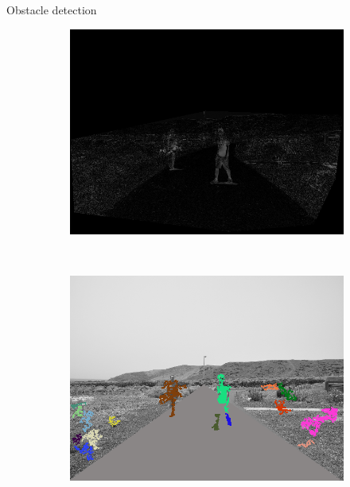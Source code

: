 \begin{frame}{Obstacle detection}
\begin{figure}[t]
\begin{subfigure}[b]{0.24\columnwidth}
	    \includegraphics[width=\textwidth]{pipeline/fig2}\label{fig:pipelineA_3}
	\end{subfigure}%
	~
	\begin{subfigure}[b]{0.24\columnwidth}
	    \includegraphics[width=\textwidth]{pipeline/fig3}\label{fig:pipelineA_4}
	\end{subfigure}%
	\\
	\begin{subfigure}[b]{0.24\columnwidth}

\end{subfigure}
\end{figure}
\end{frame}
